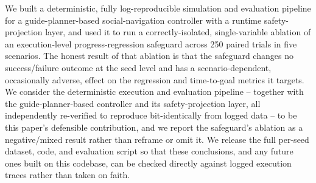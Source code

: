 \documentclass[conference,letterpaper,10pt]{ieeeconf}
\begin{document}
We built a deterministic, fully log-reproducible simulation and evaluation
pipeline for a guide-planner-based social-navigation controller with a
runtime safety-projection layer, and used it to run a correctly-isolated,
single-variable ablation of an execution-level progress-regression
safeguard across 250 paired trials in five scenarios. The honest result of
that ablation is that the safeguard changes no success/failure outcome at
the seed level and has a scenario-dependent, occasionally adverse, effect
on the regression and time-to-goal metrics it targets. We consider the
deterministic execution and evaluation pipeline -- together with the
guide-planner-based controller and its safety-projection layer, all
independently re-verified to reproduce bit-identically from logged data --
to be this paper's defensible contribution, and we report the
safeguard's ablation as a negative/mixed result rather than reframe or
omit it. We release the full per-seed dataset, code, and evaluation
script so that these conclusions, and any future ones built on this
codebase, can be checked directly against logged execution traces rather
than taken on faith.

{\small


}
\end{document}
